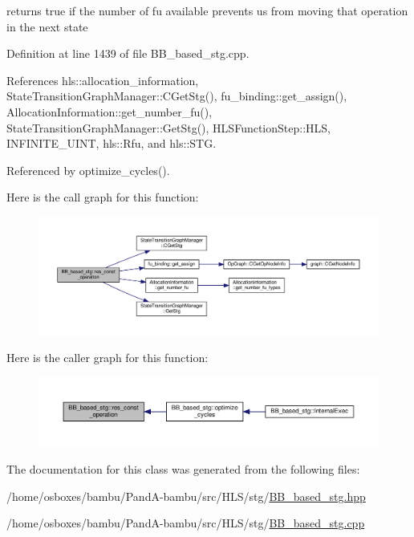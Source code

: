 returns true if the number of fu available prevents us from moving that operation in the next state 



Definition at line 1439 of file B\+B\+\_\+based\+\_\+stg.\+cpp.



References hls\+::allocation\+\_\+information, State\+Transition\+Graph\+Manager\+::\+C\+Get\+Stg(), fu\+\_\+binding\+::get\+\_\+assign(), Allocation\+Information\+::get\+\_\+number\+\_\+fu(), State\+Transition\+Graph\+Manager\+::\+Get\+Stg(), H\+L\+S\+Function\+Step\+::\+H\+LS, I\+N\+F\+I\+N\+I\+T\+E\+\_\+\+U\+I\+NT, hls\+::\+Rfu, and hls\+::\+S\+TG.



Referenced by optimize\+\_\+cycles().

Here is the call graph for this function\+:
\nopagebreak
\begin{figure}[H]
\begin{center}
\leavevmode
\includegraphics[width=350pt]{dd/d84/classBB__based__stg_a9e4b411f10ee8124e676cfcfa4b4e71d_cgraph}
\end{center}
\end{figure}
Here is the caller graph for this function\+:
\nopagebreak
\begin{figure}[H]
\begin{center}
\leavevmode
\includegraphics[width=350pt]{dd/d84/classBB__based__stg_a9e4b411f10ee8124e676cfcfa4b4e71d_icgraph}
\end{center}
\end{figure}


The documentation for this class was generated from the following files\+:\begin{DoxyCompactItemize}
\item 
/home/osboxes/bambu/\+Pand\+A-\/bambu/src/\+H\+L\+S/stg/\hyperlink{BB__based__stg_8hpp}{B\+B\+\_\+based\+\_\+stg.\+hpp}\item 
/home/osboxes/bambu/\+Pand\+A-\/bambu/src/\+H\+L\+S/stg/\hyperlink{BB__based__stg_8cpp}{B\+B\+\_\+based\+\_\+stg.\+cpp}\end{DoxyCompactItemize}
